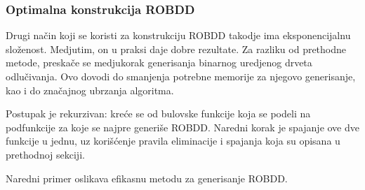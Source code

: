 \subsubsection{Optimalna konstrukcija ROBDD}
\label{subsubsec:optimalROBDDConstruction}

Drugi na\v{c}in koji se koristi za konstrukciju ROBDD takodje ima eksponencijalnu slo\v{z}enost. Medjutim, on u praksi daje dobre rezultate. Za razliku od prethodne metode, preska\v{c}e se medjukorak generisanja binarnog uredjenog drveta odlu\v{c}ivanja. Ovo dovodi do smanjenja potrebne memorije za njegovo generisanje, kao i do zna\v{c}ajnog ubrzanja algoritma.

Postupak je rekurzivan: kre\'c{}e se od bulovske funkcije koja se podeli na podfunkcije za koje se najpre generi\v{s}e ROBDD. Naredni korak je spajanje ove dve funkcije u jednu, uz kori\v{s}\'c{}enje pravila eliminacije i spajanja koja su opisana u prethodnoj sekciji.

Naredni primer oslikava efikasnu metodu za generisanje ROBDD.

